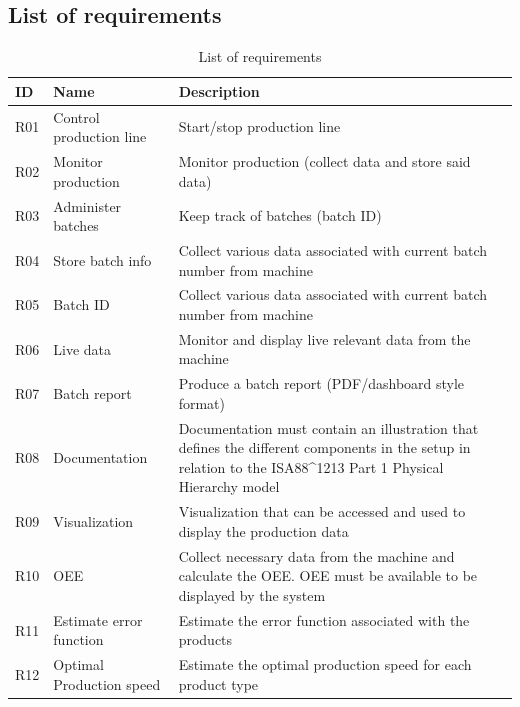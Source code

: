 \subsection{List of requirements}
\begin{table}[H]
    \begin{tabularx}{\textwidth}{|>{\RaggedRight}p{1cm}|>{\RaggedRight}p{4cm}|>{\RaggedRight}X|}
        \hline
        \textbf{ID} & \textbf{Name} & \textbf{Description} \\
        \hline
        R01 & Control production line & Start/stop production line \\
        \hline
        R02 & Monitor production & Monitor production (collect data and store said data) \\
        \hline
        R03 & Administer batches & Keep track of batches (batch ID) \\
        \hline
        R04 & Store batch info & Collect various data associated with current batch number from machine \\
        \hline
        R05 & Batch ID &Collect various data associated with current batch number from machine \\
        \hline
        R06 & Live data & Monitor and display live relevant data from the machine \\
        \hline
        R07 & Batch report & Produce a batch report (PDF/dashboard style format) \\
        \hline
        R08 & Documentation & Documentation must contain an illustration that defines the different components in the setup in relation to the ISA88^1213 Part 1 Physical Hierarchy model 	\\
        \hline
        R09 & Visualization & Visualization that can be accessed and used to display the production data                                                                                  	\\
        \hline
        R10 & OEE & Collect necessary data from the machine and calculate the OEE. OEE must be available to be displayed by the system                                          	\\
        \hline
        R11 & Estimate error function  	& Estimate the error function associated with the products                                                                                                    	\\
        \hline
        R12 & Optimal Production speed 	& Estimate the optimal production speed for each product type                                                                                                 	\\
        \hline
    \end{tabularx}
    \caption{List of requirements} 
    \label{table:requirements}
\end{table} 

